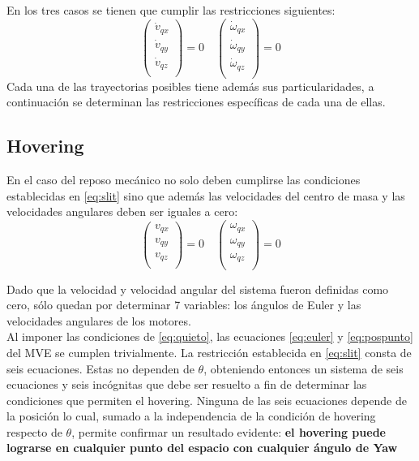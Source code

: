 \documentclass[main]{subfiles}
\begin{document}
En los tres casos se tienen que cumplir las restricciones siguientes:
\begin{equation}
\label{eq:slit}
\left(\begin{array}{c}
\dot{v}_{qx}\\
\dot{v}_{qy}\\
\dot{v}_{qz}\\
\end{array}\right)=0 \quad 
\left(\begin{array}{c}
\dot{\omega}_{qx}\\
\dot{\omega}_{qy}\\
\dot{\omega}_{qz}\\
\end{array}\right)=0
\end{equation}
Cada una de las trayectorias posibles tiene adem\'as sus particularidades, a continuaci\'on se determinan las restricciones espec\'ificas de cada una de ellas.

\subsection{Hovering}
En el caso del reposo mec\'anico no solo deben cumplirse las condiciones establecidas en \ref{eq:slit} sino que adem\'as las velocidades del centro de masa y las velocidades angulares deben ser iguales a cero:
\begin{equation}
\label{eq:quieto}
\left(\begin{array}{c}
v_{qx}\\
v_{qy}\\
v_{qz}\\
\end{array}\right)=0 \quad
\left(\begin{array}{c}
\omega_{qx}\\
\omega_{qy}\\
\omega_{qz}\\
\end{array}\right)=0
\end{equation}

Dado que la velocidad y velocidad angular del sistema fueron definidas como cero, s\'olo quedan por determinar 7 variables: los \'angulos de Euler y las velocidades angulares de los motores. \\

Al imponer las condiciones de \ref{eq:quieto}, las ecuaciones \ref{eq:euler} y \ref{eq:pospunto} del MVE se cumplen trivialmente. La restricci\'on establecida en \ref{eq:slit} consta de seis ecuaciones. Estas no dependen de $\theta$, obteniendo entonces un sistema de seis ecuaciones y seis inc\'ognitas que debe ser resuelto a fin de determinar las condiciones que permiten el hovering. Ninguna de las seis ecuaciones depende de la posici\'on  lo cual, sumado a la independencia de la condici\'on de hovering respecto de $\theta$, permite confirmar un resultado evidente: \textbf{el hovering puede lograrse en cualquier punto del espacio con cualquier \'angulo de Yaw}\\
\end{document}
